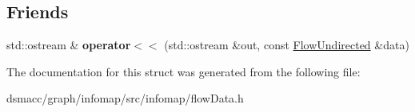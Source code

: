 \subsection*{Friends}
\begin{DoxyCompactItemize}
\item 
\mbox{\label{structFlowUndirected_a44f18ceef76135be6426af552a0425ad}} 
std\+::ostream \& {\bfseries operator$<$$<$} (std\+::ostream \&out, const \mbox{\hyperlink{structFlowUndirected}{Flow\+Undirected}} \&data)
\end{DoxyCompactItemize}


The documentation for this struct was generated from the following file\+:\begin{DoxyCompactItemize}
\item 
dsmacc/graph/infomap/src/infomap/flow\+Data.\+h\end{DoxyCompactItemize}
